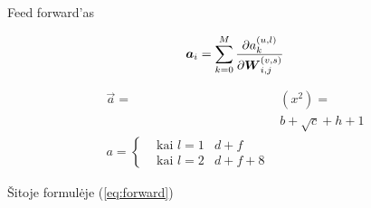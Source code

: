 Feed forward'as

\begin{equation} \label{eq:forward}
  \text{\boldmath $a$}_i = \sum_{k=0}^{M} \frac{\partial a_{k}^{(u,l)}}{\partial \text{\boldmath $W$}_{i,j}^{(v,s)}}
\end{equation}

\begin{equation*}
  \begin{aligned}
    \vec{a} = &\left( x^2 \right) = \\ %
    &b+\sqrt{c} + h + 1 \\
    a = \left \{
    \begin{aligned}
      &\text{kai } l=1 & d+f\\
      &\text{kai } l=2 & d+f+8
    \end{aligned}
    \right.
  \end{aligned}
\end{equation*}

Šitoje formulėje (\ref{eq:forward})
